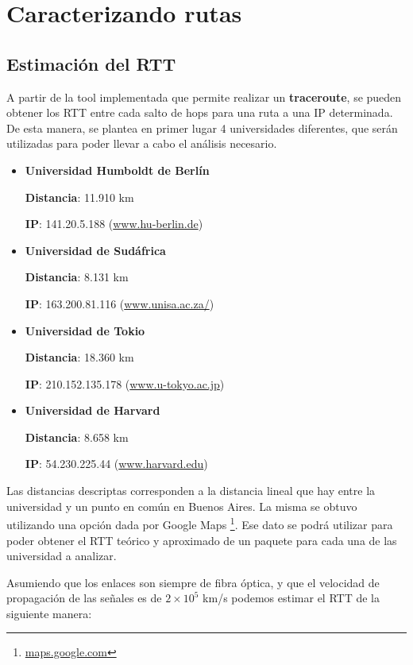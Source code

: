 \section{Caracterizando rutas}

\subsection{Estimación del RTT}
A partir de la tool implementada que permite realizar un \textbf{traceroute}, se pueden obtener los RTT entre cada salto de hops para una ruta a una IP determinada. De esta manera, se plantea en primer lugar 4 universidades diferentes, que serán utilizadas para poder llevar a cabo el análisis necesario.

\begin{itemize}
 \item {\bf Universidad Humboldt de Berlín}
 
	{\bf Distancia}: 11.910 km 
	
	{\bf IP}: 141.20.5.188 (\url{www.hu-berlin.de}{})
 
 \item {\bf Universidad de Sudáfrica}

	{\bf Distancia}: 8.131 km
	
	{\bf IP}: 163.200.81.116  (\url{www.unisa.ac.za/}{})

 \item {\bf Universidad de Tokio}

	{\bf Distancia}: 18.360 km
	
	{\bf IP}: 210.152.135.178 (\url{www.u-tokyo.ac.jp}{}) 

 \item {\bf Universidad de Harvard}

	{\bf Distancia}: 8.658 km 
	
	{\bf IP}: 54.230.225.44 (\url{www.harvard.edu}{})

\end{itemize}

Las distancias descriptas corresponden a la distancia lineal que hay entre la universidad y un punto en común en Buenos Aires. La misma se obtuvo utilizando una opción dada por Google Maps \footnote{\url{maps.google.com}{}}. Ese dato se podrá utilizar para poder obtener el RTT teórico y aproximado de un paquete para cada una de las universidad a analizar. 

Asumiendo que los enlaces son siempre de fibra óptica, y que el velocidad de propagación de las señales es de $2 \times 10^{5}$ km/s podemos estimar el RTT de la siguiente manera: 

